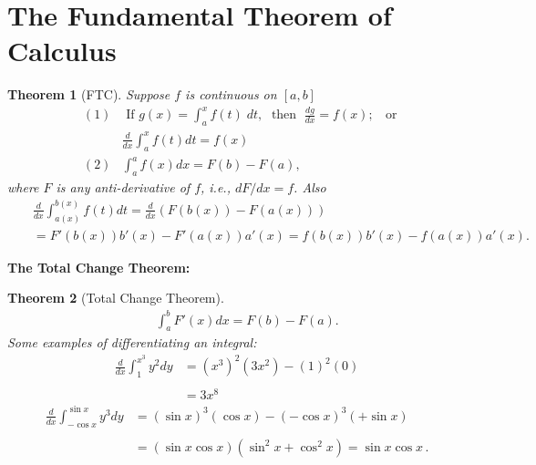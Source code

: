 \documentclass{article}
\newtheorem{theorem}{Theorem}[section]
\begin{document}
\section{The Fundamental Theorem of Calculus}
\begin{theorem}[FTC]
Suppose $f$ is continuous on $[a,b]$
\begin{eqnarray}
& (1) & \mbox{ If } g(x)=\int_a^x f(t) \; dt, \; \mbox{ then } \;
\frac{d g}{d x}= f(x); \;\; \mbox{ or  } \nonumber \\ 
& & \frac{d }{d x} \int_a^x f(t) dt =f(x)
\nonumber \\
& (2) &\int_a^a f(x) dx = F(b)-F(a),    \nonumber
\end{eqnarray}
where $F$ is any anti-derivative of $f$, i.e., $d F/dx=f$. Also
\begin{eqnarray}
& & \frac{d }{d x} \int_{a(x)}^{b(x)} f(t) dt = \frac{d }{d x} \left(F(b(x))-F(a(x))\right) \nonumber\\ 
&& = F'(b(x))b'(x) - F'(a(x))a'(x) = f(b(x))b'(x)-f(a(x)) a'(x).    \nonumber
\end{eqnarray}
\end{theorem}
{\large \bf The Total Change Theorem:}
\begin{theorem}[Total Change Theorem]
\begin{eqnarray}
& &\int_a^b F'(x) dx = F(b)-F(a).    \nonumber
\end{eqnarray}
Some examples of differentiating an integral:
$$
\begin{array}{ll}
 \displaystyle\frac{d}{dx} \int_1^{x^3} y^2 dy 
& = (x^3)^2(3 x^2)- (1)^2(0) \\
\\
& = 3 x^8
\end{array}
$$
$$
\begin{array}{ll}
 \displaystyle\frac{d}{dx} \int_{-\cos x}^{\sin x} y^3 dy & = (\sin x)^3(\cos x) - (-\cos x)^3 (+\sin x) \\
\\
& = (\sin x \cos x)(\sin^2 x + \cos^2 x) =  \sin x \cos x\,.
\end{array}
$$
\end{theorem}
\end{document}
